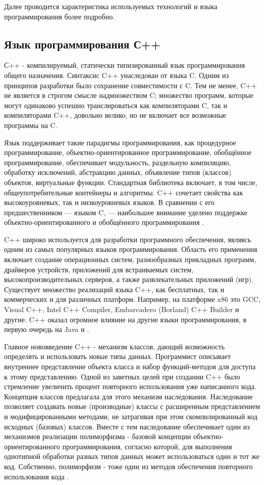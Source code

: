 Далее проводится характеристика используемых технологий и языка программирования более подробно.

\subsection{Язык программирования С++}
\label{sub:practice:cpp_overview}
С++ - компилируемый, статически типизированный язык программирования общего назначения. Синтаксис C++ унаследован от языка C. Одним из принципов разработки было сохранение совместимости с C. Тем не менее, C++ не является в строгом смысле надмножеством C; множество программ, которые могут одинаково успешно транслироваться как компиляторами C, так и компиляторами C++, довольно велико, но не включает все возможные программы на C.

Язык поддерживает такие парадигмы программирования, как процедурное программирование, объектно-ориентированное программирование, обобщённое программирование, обеспечивает модульность, раздельную компиляцию, обработку исключений, абстракцию данных, объявление типов (классов) объектов, виртуальные функции. Стандартная библиотека включает, в том числе, общеупотребительные контейнеры и алгоритмы. C++ сочетает свойства как высокоуровневых, так и низкоуровневых языков. В сравнении с его предшественником — языком C, — наибольшее внимание уделено поддержке объектно-ориентированного и обобщённого программирования \cite{cpp_book}.

C++ широко используется для разработки программного обеспечения, являясь одним из самых популярных языков программирования. Область его применения включает создание операционных систем, разнообразных прикладных программ, драйверов устройств, приложений для встраиваемых систем, высокопроизводительных серверов, а также развлекательных приложений (игр). Существует множество реализаций языка C++, как бесплатных, так и коммерческих и для различных платформ. Например, на платформе x86 это GCC, Visual C++, Intel C++ Compiler, Embarcadero (Borland) C++ Builder и другие. C++ оказал огромное влияние на другие языки программирования, в первую очередь на Java и \csharp{}.

Главное нововведение C++ - механизм классов, дающий возможность определять и использовать новые типы данных. Программист описывает внутреннее представление объекта класса и набор функций-методов для доступа к этому представлению. Одной из заветных целей при создании C++ было стремление увеличить процент повторного использования уже написанного кода. Концепция классов предлагала для этого механизм наследования. Наследование позволяет создавать новые (производные) классы с расширенным представлением и модифицированными методами, не затрагивая при этом скомпилированный код исходных (базовых) классов. Вместе с тем наследование обеспечивает один из механизмов реализации полиморфизма - базовой концепции объектно-ориентированного программирования, согласно которой, для выполнения однотипной обработки разных типов данных может использоваться один и тот же код. Собственно, полиморфизм - тоже один из методов обеспечения повторного использования кода \cite{cpp_book_two}.

